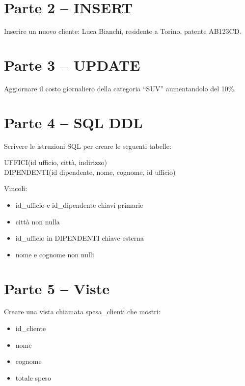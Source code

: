 \documentclass[a4paper,12pt]{article}
\begin{document}
\section*{Parte 2 – INSERT}
Inserire un nuovo cliente: Luca Bianchi, residente a Torino, patente AB123CD.

\section*{Parte 3 – UPDATE}
Aggiornare il costo giornaliero della categoria “SUV” aumentandolo del 10\%.

\section*{Parte 4 – SQL DDL}
Scrivere le istruzioni SQL per creare le seguenti tabelle:

UFFICI(id ufficio, città, indirizzo)\\
DIPENDENTI(id dipendente, nome, cognome, id ufficio)

Vincoli:
\begin{itemize}
\item id\_ufficio e id\_dipendente chiavi primarie
\item città non nulla
\item id\_ufficio in DIPENDENTI chiave esterna
\item nome e cognome non nulli
\end{itemize}

\section*{Parte 5 – Viste}
Creare una vista chiamata spesa\_clienti che mostri:
\begin{itemize}
\item id\_cliente
\item nome
\item cognome
\item totale speso
\end{itemize}
\end{document}
